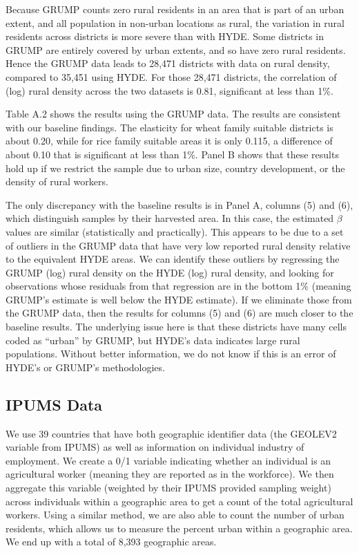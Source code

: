 \documentclass[11pt]{article}
\begin{document}
Because GRUMP counts zero rural residents in an area that is part of an urban extent, and all population in non-urban locations as rural, the variation in rural residents across districts is more severe than with HYDE. Some districts in GRUMP are entirely covered by urban extents, and so have zero rural residents. Hence the GRUMP data leads to 28,471 districts with data on rural density, compared to 35,451 using HYDE. For those 28,471 districts, the correlation of (log) rural density across the two datasets is 0.81, significant at less than 1\%. 

Table A.2 shows the results using the GRUMP data. The results are consistent with our baseline findings. The elasticity for wheat family suitable districts is about 0.20, while for rice family suitable areas it is only 0.115, a difference of about 0.10 that is significant at less than 1\%. Panel B shows that these results hold up if we restrict the sample due to urban size, country development, or the density of rural workers.

The only discrepancy with the baseline results is in Panel A, columns (5) and (6), which distinguish samples by their harvested area. In this case, the estimated $\beta$ values are similar (statistically and practically). This appears to be due to a set of outliers in the GRUMP data that have very low reported rural density relative to the equivalent HYDE areas. We can identify these outliers by regressing the GRUMP (log) rural density on the HYDE (log) rural density, and looking for observations whose residuals from that regression are in the bottom 1\% (meaning GRUMP's estimate is well below the HYDE estimate). If we eliminate those from the GRUMP data, then the results for columns (5) and (6) are much closer to the baseline results. The underlying issue here is that these districts have many cells coded as ``urban'' by GRUMP, but HYDE's data indicates large rural populations. Without better information, we do not know if this is an error of HYDE's or GRUMP's methodologies.

\subsection{IPUMS Data}
We use 39 countries that have both geographic identifier data (the GEOLEV2 variable from IPUMS) as well as information on individual industry of employment. We create a 0/1 variable indicating whether an individual is an agricultural worker (meaning they are reported as in the workforce). We then aggregate this variable (weighted by their IPUMS provided sampling weight) across individuals within a geographic area to get a count of the total agricultural workers. Using a similar method, we are also able to count the number of urban residents, which allows us to measure the percent urban within a geographic area. We end up with a total of 8,393 geographic areas.
\end{document}
